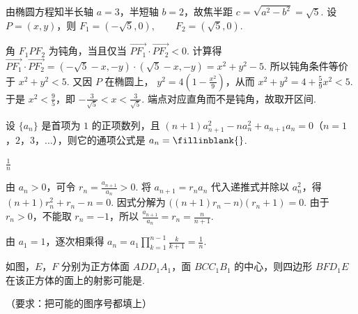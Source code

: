 \begin{solution}
由椭圆方程知半长轴 \(a=3\)，半短轴 \(b=2\)，故焦半距
\(
c=\sqrt{a^{2}-b^{2}}=\sqrt{5}
\).
设 \(P=(x,y)\)，则
\(
F_{1}=(-\sqrt{5},0),\qquad F_{2}=(\sqrt{5},0)
\).

角 \(F_{1}PF_{2}\) 为钝角，当且仅当
\(
\overrightarrow{PF_{1}}\cdot\overrightarrow{PF_{2}}<0
\).
计算得
\(
\overrightarrow{PF_{1}}\cdot\overrightarrow{PF_{2}}
=(-\sqrt{5}-x,-y)\cdot(\sqrt{5}-x,-y)
=x^{2}+y^{2}-5
\).
所以钝角条件等价于 \(x^{2}+y^{2}<5\). 又因 \(P\) 在椭圆上，
\(
y^{2}=4\left(1-\frac{x^{2}}{9}\right)
\)，从而
\(
x^{2}+y^{2}=4+\frac{5}{9}x^{2}<5
\).
于是 \(x^{2}<\frac{9}{5}\)，即
\(
-\frac{3}{\sqrt{5}}<x<\frac{3}{\sqrt{5}}
\).
端点对应直角而不是钝角，故取开区间.
\end{solution}

\begin{problem}
设 \(\{a_{n}\}\) 是首项为 \(1\) 的正项数列，且 \((n + 1)a_{n + 1}^{2} - na_{n}^{2} + a_{n + 1}a_{n} = 0\)（\(n = 1\)，\(2\)，\(3\)，\(\dots\)），则它的通项公式是 \(a_{n} =\fillinblank{}\).
\end{problem}

\begin{answer}
\(\frac{1}{n}\)
\end{answer}

\begin{solution}
由 \(a_n>0\)，可令
\(
r_n=\frac{a_{n+1}}{a_n}>0
\).
将 \(a_{n+1}=r_na_n\) 代入递推式并除以 \(a_n^2\)，得
\(
(n+1)r_n^{2}+r_n-n=0
\).
因式分解为
\(
\bigl((n+1)r_n-n\bigr)(r_n+1)=0
\).
由于 \(r_n>0\)，不能取 \(r_n=-1\)，所以
\(
\frac{a_{n+1}}{a_n}=r_n=\frac{n}{n+1}
\).

由 \(a_1=1\)，逐次相乘得
\(
a_n=a_1\prod_{k=1}^{n-1}\frac{k}{k+1}
=\frac{1}{n}
\).
\end{solution}

\begin{problem}
如图，\(E\)，\(F\) 分别为正方体面 \(ADD_{1}A_{1}\)，面 \(BCC_{1}B_{1}\) 的中心，则四边形 \(BFD_{1}E\) 在该正方体的面上的射影可能是\fillinblank{}.

（要求：把可能的图序号都填上）

\begingroup
\leftskip=0pt\relax
\rightskip=0pt\relax
{}
\endgroup
\end{problem}

